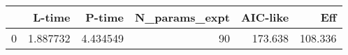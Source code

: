 \begin{tabular}{lrrrrr}
\toprule
{} &    L-time &    P-time &  N\_params\_expt &  AIC-like &      Eff \\
\midrule
0 &  1.887732 &  4.434549 &             90 &   173.638 &  108.336 \\
\bottomrule
\end{tabular}
